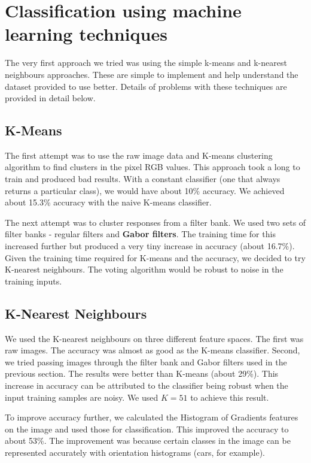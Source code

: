 \documentclass{article} %
\begin{document}
\section{Classification using machine learning techniques}
    The very first approach we tried was using the simple k-means and k-nearest neighbours approaches. These are simple to implement and help understand the dataset provided to use better. Details of problems with these techniques are provided in detail below.
\subsection{K-Means} %
The first attempt was to use the raw image data and K-means clustering algorithm to find clusters in the pixel RGB values. This approach took a long to train and produced bad results. With a constant classifier (one that always returns a particular class), we would have about 10\% accuracy. We achieved about 15.3\% accuracy with the naive K-means classifier. %

        The next attempt was to cluster responses from a filter bank. We used two sets of filter banks - regular filters and \textbf{Gabor filters}. The training time for this increased further but produced a very tiny increase in accuracy (about 16.7\%). Given the training time required for K-means and the accuracy, we decided to try K-nearest neighbours. The voting algorithm would be robust to noise in the training inputs.

\subsection{K-Nearest Neighbours} %
We used the K-nearest neighbours on three different feature spaces. The first was raw images. The accuracy was almost as good as the K-means classifier. Second, we tried passing images through the filter bank and Gabor filters used in the previous section. The results were better than K-means (about 29\%). This increase in accuracy can be attributed to the classifier being robust when the input training samples are noisy. We used $K=51$ to achieve this result.

        To improve accuracy further, we calculated the Histogram of Gradients features on the image and used those for classification. This improved the accuracy to about 53\%. The improvement was because certain classes in the image can be represented accurately with orientation histograms (cars, for example).
\end{document}
